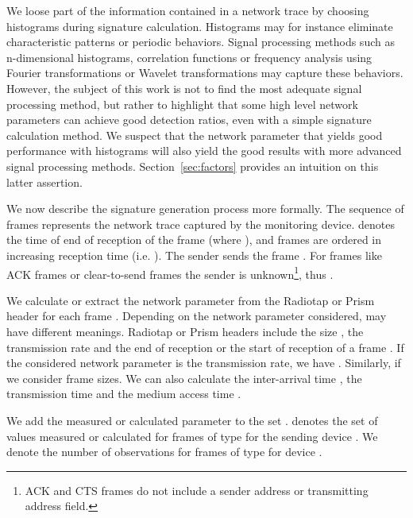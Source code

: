 \documentclass[10pt, conference, compsocconf, letterpaper]{IEEEtran}
\begin{document}
We loose part of the information contained in a network trace by choosing histograms during signature calculation. Histograms may for instance eliminate characteristic patterns or periodic behaviors. Signal processing methods such as n-dimensional histograms, correlation functions or frequency analysis using Fourier transformations or Wavelet transformations may capture these behaviors. However, the subject of this work is not to find the most adequate signal processing method, but rather to highlight that some high level network parameters can achieve good detection ratios, even with a simple signature calculation method. We suspect that the network parameter that yields good performance with histograms will also yield the good results with more advanced signal processing methods. Section~\ref{sec:factors} provides an intuition on this latter assertion.
 
We now describe the signature generation process more formally. 
The sequence  of frames represents the network trace captured by the monitoring device.
 denotes the time of end of reception of the frame  (where ), and frames are ordered in increasing reception time (i.e. ). The sender  sends the frame .
For frames like ACK frames or clear-to-send frames \cite{IEEE:80211} the sender is unknown\footnote{ACK and CTS frames do not include a sender address or transmitting address field.}, thus .

We calculate or extract the network parameter  from the Radiotap or Prism header for each frame .
Depending on the network parameter considered,  may have different meanings.
Radiotap or Prism headers include the size , the transmission rate  and the end of reception or the start of reception  of a frame . If the considered network parameter is the transmission rate, we have .  Similarly,  if we consider frame sizes. We can also calculate the inter-arrival time , the transmission time  and the medium access time . 

We add the measured or calculated parameter to the set .  denotes the set of values measured or calculated for frames of type  for the sending device . We denote  the number of observations for frames of type  for device .
\end{document}
